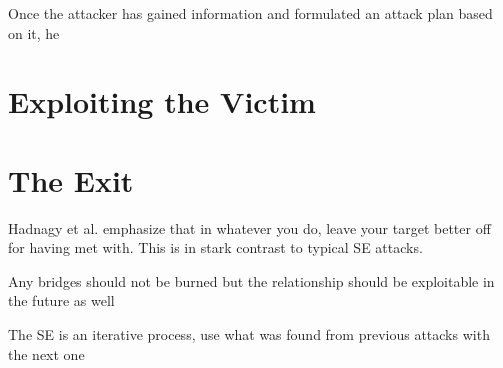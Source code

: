 Once the attacker has gained information and formulated an attack plan based on it, he 


 





\section{Exploiting the Victim}
\begin{comment}
    
    - 

\end{comment}












\section{The Exit}
\begin{comment}
    
    - 

\end{comment}


Hadnagy et al. emphasize that in whatever you do, leave your target better off for having met with. This is in stark contrast to typical SE attacks.

Any bridges should not be burned but the relationship should be exploitable in the future as well

The SE is an iterative process, use what was found from previous attacks with the next one